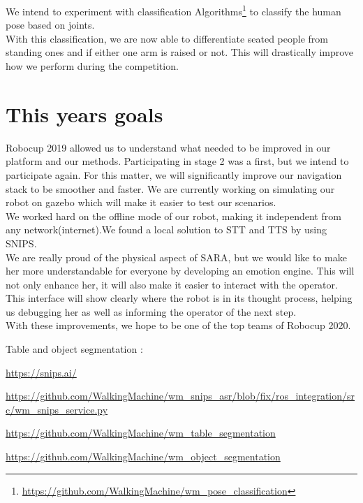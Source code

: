 \documentclass[runningheads,a4paper]{llncs}
\begin{document}
We intend to experiment with classification Algorithms\footnote{\url{https://github.com/WalkingMachine/wm_pose_classification}} to classify the human pose based on joints.\\

With this classification, we are now able to differentiate seated people from standing ones and if either one arm is raised or not. This will drastically improve how we perform during the competition.\\

\newpage
\section{This years goals}

\tab Robocup 2019 allowed us to understand what needed to be improved in our platform and our methods. Participating in stage 2 was a first, but we intend to participate again. For this matter, we will significantly improve our navigation stack to be smoother and faster. We are currently working on simulating our robot on gazebo which will make it easier to test our scenarios.\\
 
We worked hard on the offline mode of our robot, making it independent from any network(internet).We found a local solution to STT and TTS by using SNIPS.\\
 
We are really proud of the physical aspect of SARA, but we would like to make her more understandable for everyone by developing an emotion engine. This will not only enhance her, it will also make it easier to interact with the operator. This interface will show clearly where the robot is in its thought process, helping us debugging her as well as informing the operator of the next step.\\

With these improvements, we hope to be one of the top teams of Robocup 2020.
\newpage




Table and object segmentation : 

\url{https://snips.ai/}

\url{https://github.com/WalkingMachine/wm_snips_asr/blob/fix/ros_integration/src/wm_snips_service.py}

\url{https://github.com/WalkingMachine/wm_table_segmentation}

\url{https://github.com/WalkingMachine/wm_object_segmentation} \\
\end{document}

